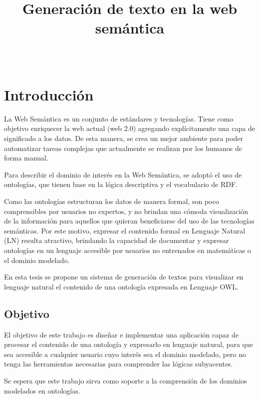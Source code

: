 \documentclass[11pt,a4paper,spanish]{book}
\begin{document}
	
\title{Generación de texto en la web semántica}
\author{\ }
\date{}
\maketitle

\frontmatter
\tableofcontents
\mainmatter

\chapter{Introducción}
La Web Semántica es un conjunto de estándares y tecnologías. Tiene como objetivo enriquecer la web actual (web 2.0) agregando explícitamente una capa de significado a los datos. De esta manera, se crea un mejor ambiente para poder automatizar tareas complejas que actualmente se realizan por los humanos de forma manual. 

Para describir el dominio de interés en la Web Semántica, se adoptó el uso de ontologías, que tienen base en la lógica descriptiva y el vocabulario de RDF.

Como las ontologías estructuran los datos de manera formal, son poco comprensibles por usuarios no expertos, y no brindan una cómoda visualización de la información para aquellos que quieran beneficiarse del uso de las tecnologías semánticas. Por este motivo, expresar el contenido formal en Lenguaje Natural (LN) resulta atractivo, brindando la capacidad de documentar y expresar ontologías en un lenguaje accesible por usuarios no entrenados en matemáticas o el dominio modelado. 

En esta tesis se propone un sistema de generación de textos para visualizar en lenguaje natural el contenido de una ontología expresada en Lenguaje OWL.

\section{Objetivo}\label{Intro:objetivo}
El objetivo de este trabajo es diseñar e implementar una aplicación capaz de procesar el contenido de una ontología y expresarlo en lenguaje natural, para que sea accesible a cualquier usuario cuyo interés sea el dominio modelado, pero no tenga las herramientas necesarias para comprender las lógicas subyacentes.

Se espera que este trabajo sirva como soporte a la comprensión de los dominios modelados en ontologías.
\end{document}
